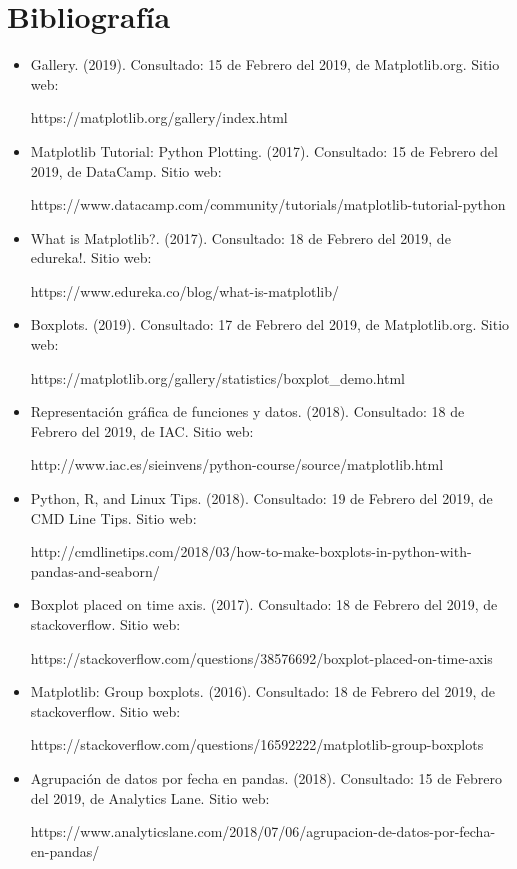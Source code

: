 \documentclass{article}
\begin{document}
\section{Bibliografía}
\begin{itemize}
    \item Gallery. (2019). Consultado: 15 de Febrero del 2019, de Matplotlib.org. Sitio web:
    
    https://matplotlib.org/gallery/index.html
    
    \item Matplotlib Tutorial: Python Plotting. (2017). Consultado: 15 de Febrero del 2019, de DataCamp. Sitio web: 
    
    https://www.datacamp.com/community/tutorials/matplotlib-tutorial-python
    
    \item What is Matplotlib?. (2017). Consultado: 18 de Febrero del 2019, de edureka!. Sitio web:
    
    https://www.edureka.co/blog/what-is-matplotlib/
    
    \item Boxplots. (2019). Consultado: 17 de Febrero del 2019, de Matplotlib.org. Sitio web:
    
    https://matplotlib.org/gallery/statistics/boxplot\_demo.html
    
    \item Representación gráfica de funciones y datos. (2018). Consultado: 18 de Febrero del 2019, de IAC. Sitio web: 
    
    http://www.iac.es/sieinvens/python-course/source/matplotlib.html

    \item Python, R, and Linux Tips. (2018). Consultado: 19 de Febrero del 2019, de CMD Line Tips. Sitio web: 
    
    http://cmdlinetips.com/2018/03/how-to-make-boxplots-in-python-with-pandas-and-seaborn/
    
    \item Boxplot placed on time axis. (2017). Consultado: 18 de Febrero del 2019, de stackoverflow. Sitio web:
    
    https://stackoverflow.com/questions/38576692/boxplot-placed-on-time-axis
    
    \item Matplotlib: Group boxplots. (2016). Consultado: 18 de Febrero del 2019, de stackoverflow. Sitio web:
    
    https://stackoverflow.com/questions/16592222/matplotlib-group-boxplots
    
    \item Agrupación de datos por fecha en pandas. (2018). Consultado: 15 de Febrero del 2019, de Analytics Lane. Sitio web:
    
    https://www.analyticslane.com/2018/07/06/agrupacion-de-datos-por-fecha-en-pandas/
    
    
    
\end{itemize}
\end{document}
